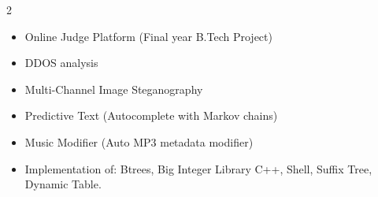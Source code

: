\documentclass[10pt,a4paper,ragged2e,withhyper]{altacv}
\begin{document}
\begin{paracol}{2}
\href{https://github.com/ganesh-k13?tab=repositories}{\color{DarkBlue}{Project repositories}}
\begin{itemize}
\item Online Judge Platform (Final year B.Tech Project)
\item DDOS analysis
\item Multi-Channel Image Steganography
\item Predictive Text (Autocomplete with Markov chains)
\item Music Modifier (Auto MP3 metadata modifier)
\item Implementation of: Btrees, Big Integer Library C++, Shell, Suffix Tree, Dynamic Table.
\end{itemize}

\end{paracol}
\end{document}
